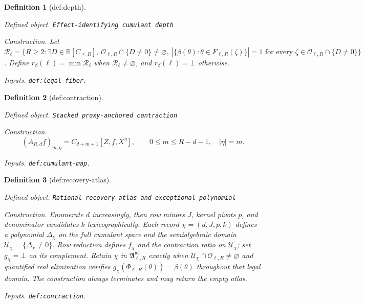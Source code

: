 \documentclass{article}
\newtheorem{definition}{Definition}
\begin{document}
\begin{definition}[def:depth]\label{def:depth}
\par\smallskip\noindent\emph{Defined object.} \texttt{Effect-\allowbreak{}identifying cumulant depth}
\par\smallskip\noindent\emph{Construction.} Let \(\mathscr R_{\ell}=\{R\ge2:\exists D\in\mathbb R[C_{\le R}],\ \mathcal O_{\ell,R}\cap\{D\ne0\}\ne\varnothing,\ |\{\beta(\theta):\theta\in F_{\ell,R}(\zeta)\}|=1\text{ for every }\zeta\in\mathcal O_{\ell,R}\cap\{D\ne0\}\}\). Define \(r_{\beta}(\ell)=\min\mathscr R_{\ell}\) when \(\mathscr R_{\ell}\ne\varnothing\), and \(r_{\beta}(\ell)=\bot\) otherwise.
\par\smallskip\noindent\emph{Inputs.} \texttt{def:\allowbreak{}legal-\allowbreak{}fiber}.
\end{definition}

\begin{definition}[def:contraction]\label{def:contraction}
\par\smallskip\noindent\emph{Defined object.} \texttt{Stacked proxy-\allowbreak{}anchored contraction}
\par\smallskip\noindent\emph{Construction.} \[(A_{R,d}f)_{m,\eta}=C_{d+m+1}[Z,f,X^{\eta}],\qquad 0\le m\le R-d-1,\quad |\eta|=m.\]
\par\smallskip\noindent\emph{Inputs.} \texttt{def:\allowbreak{}cumulant-\allowbreak{}map}.
\end{definition}

\begin{definition}[def:recovery-atlas]\label{def:recovery-atlas}
\par\smallskip\noindent\emph{Defined object.} \texttt{Rational recovery atlas and exceptional polynomial}
\par\smallskip\noindent\emph{Construction.} Enumerate \(d\) increasingly, then row minors \(J\), kernel pivots \(p\), and denominator candidates \(k\) lexicographically. Each record \(\chi=(d,J,p,k)\) defines a polynomial \(\Delta_{\chi}\) on the full cumulant space and the semialgebraic domain \(\mathcal U_{\chi}=\{\Delta_{\chi}\ne0\}\). Row reduction defines \(f_{\chi}\) and the contraction ratio on \(\mathcal U_{\chi}\); set \(g_{\chi}=\bot\) on its complement. Retain \(\chi\) in \(\mathfrak A^{\mathrm{id}}_{\ell,R}\) exactly when \(\mathcal U_{\chi}\cap\mathcal O_{\ell,R}\ne\varnothing\) and quantified real elimination verifies \(g_{\chi}(\Phi_{\ell,R}(\theta))=\beta(\theta)\) throughout that legal domain. The construction always terminates and may return the empty atlas.
\par\smallskip\noindent\emph{Inputs.} \texttt{def:\allowbreak{}contraction}.
\end{definition}
\end{document}
